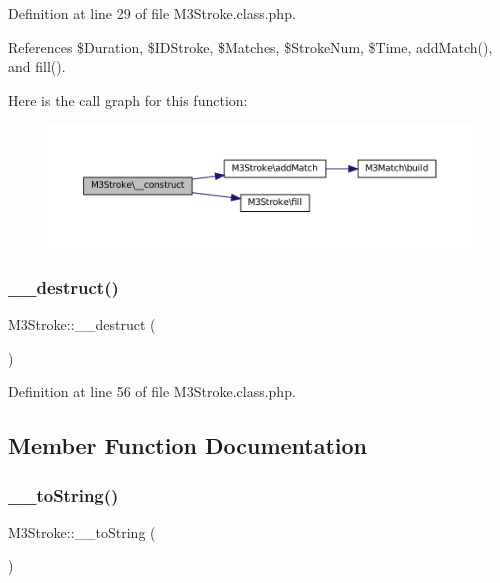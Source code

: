 Definition at line 29 of file M3\+Stroke.\+class.\+php.



References \$\+Duration, \$\+I\+D\+Stroke, \$\+Matches, \$\+Stroke\+Num, \$\+Time, add\+Match(), and fill().

Here is the call graph for this function\+:\nopagebreak
\begin{figure}[H]
\begin{center}
\leavevmode
\includegraphics[width=350pt]{class_m3_stroke_ad6d724aa8f899efc6a413277454bb2ec_cgraph}
\end{center}
\end{figure}
\mbox{\label{class_m3_stroke_ae6ccf3c65b84509cf8a37cfaaf11292d}} 
\subsubsection{\texorpdfstring{\+\_\+\+\_\+destruct()}{\_\_destruct()}}
{\footnotesize\ttfamily M3\+Stroke\+::\+\_\+\+\_\+destruct (\begin{DoxyParamCaption}{ }\end{DoxyParamCaption})}



Definition at line 56 of file M3\+Stroke.\+class.\+php.



\subsection{Member Function Documentation}
\mbox{\label{class_m3_stroke_aee60e7a145ea3b9aff3330f1b09c7527}} 
\subsubsection{\texorpdfstring{\+\_\+\+\_\+to\+String()}{\_\_toString()}}
{\footnotesize\ttfamily M3\+Stroke\+::\+\_\+\+\_\+to\+String (\begin{DoxyParamCaption}{ }\end{DoxyParamCaption})}



